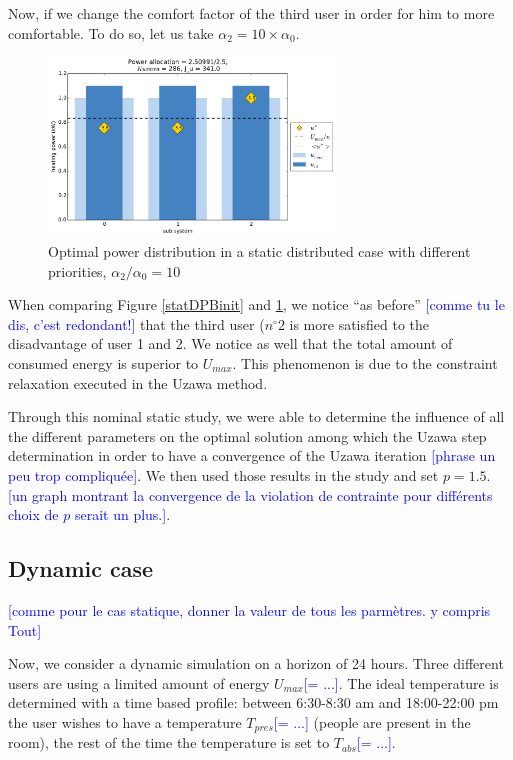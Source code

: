 \documentclass[conference]{IEEEtran}
\edef\hc{\string:}
\newcommand{\rem}[1]{\textcolor{blue}{[#1]}}
\begin{document}
Now, if we change the comfort factor of the third user in order for him to more comfortable. To do so, let us take $\alpha_2 = 10 \times \alpha_0 $.

\begin{figure}[H]
\centering
\includegraphics[width=3in]{static_DPB_cht.pdf}
\caption{Optimal power distribution in a static distributed case with different priorities, $\alpha_2 / \alpha_0 = 10$}
\label{statDPBcom}
\end{figure}
 
 When comparing Figure \ref{statDPBinit} and \ref{statDPBcom}, we notice ``as before'' \rem{comme tu le dis, c'est redondant!} that the third user ($n^{\circ}2$ is more satisfied to the disadvantage of user 1 and 2. We notice as well that the total amount of consumed energy is superior to $U_{max}$. This phenomenon is due to the constraint relaxation executed in the Uzawa method.
 
 Through this nominal static study, we were able to determine the influence of all the different parameters on the optimal solution among which the Uzawa step determination in order to have a convergence of the Uzawa iteration \rem{phrase un peu trop compliquée}.  We then used those results in the study and set $p = 1.5$. \rem{un graph montrant la convergence de la violation de contrainte pour différents choix de $p$ serait un plus.}.
 
 \subsection{Dynamic case}

 \rem{comme pour le cas statique, donner la valeur de tous les parmètres. y compris Tout}

 Now, we consider a dynamic simulation on a horizon of 24 hours. Three different users are using a limited amount of energy $U_{max}$\rem{= ...}. The ideal temperature is determined with a time based profile: between 6\hc 30-8\hc 30 am and 18\hc 00-22\hc 00 pm the user wishes to have a temperature $T_{pres}$\rem{= ...} (people are present in the room), the rest of the time the temperature is set to $T_{abs}$\rem{= ...}.
 
\end{document}
